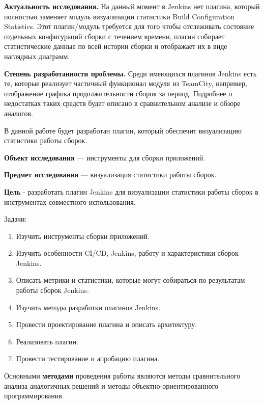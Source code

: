 \textbf{Актуальность исследования.} На данный момент в Jenkins нет плагина, который полностью заменяет модуль визуализации статистики Build Configuration Statistics. Этот плагин/модуль требуется для того чтобы отслеживать состояние отдельных конфигураций сборки с течением времени, плагин собирает статистические данные по всей истории сборки и отображает их в виде наглядных диаграмм.

\textbf{Степень разработанности проблемы.} Среди имеющихся плагинов Jenkins есть те, которые реализует частичный функционал модуля из TeamCity, например, отображение графика продолжительности сборок за период. Подробнее о недостатках таких средств будет описано в сравнительном анализе и обзоре аналогов. 

В данной работе будет разработан плагин, который обеспечит визуализацию статистики работы сборок.

\textbf{Объект исследования} — инструменты для сборки приложений.

\textbf{Предмет исследования} — визуализация статистики работы сборок.

\textbf{Цель} - разработать плагин Jenkins для визуализации статистики работы сборок в инструментах совместного использования.

Задачи:
 
\begin{enumerate}
	\item Изучить инструменты сборки приложений.
	
	\item Изучить особенности CI/CD, Jenkins, работу и характеристики сборок Jenkins.
	
	\item Описать метрики и статистики, которые могут собираться по результатам работы сборок Jenkins.
	
	\item Изучить методы разработки плагинов Jenkins.
	
	\item Провести проектирование плагина и описать архитектуру.
	
	\item Реализовать плагин.
	
	\item Провести тестирование и апробацию плагина. 
	
\end{enumerate}

Основными \textbf{методами} проведения работы являются методы сравнительного анализа аналогичных решений и методы объектно-ориентированного программирования.




